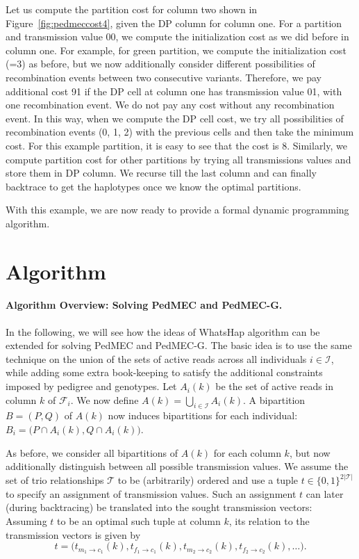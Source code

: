 Let us compute the partition cost for column two shown in Figure~\ref{fig:pedmeccost4}, given the DP column for column one.
For a partition and transmission value 00, we compute the initialization cost as we did before in column one. 
For example, for green partition, we compute the initialization cost (=3) as before, but we now additionally consider different possibilities of recombination events between two consecutive variants.
Therefore, we pay additional cost 91 if the DP cell at column one has transmission value 01, with one recombination event. We do not pay any cost without any recombination event.
In this way, when we compute the DP cell cost, we try all possibilities of recombination events (0, 1, 2) with the previous cells and then take the minimum cost. For this example partition, it is easy to see that the cost is 8.
Similarly, we compute partition cost for other partitions by trying all transmissions values and store them in DP column.
We recurse till the last column and can finally backtrace to get the haplotypes once we know the optimal partitions.

With this example, we are now ready to provide a formal dynamic programming algorithm.

\section{Algorithm}\label{sec:algorithm}
\paragraph{Algorithm Overview: Solving PedMEC and PedMEC-G.}
In the following, we will see how the ideas of WhatsHap algorithm can be extended for solving PedMEC and PedMEC-G.
The basic idea is to use the same technique on the union of the sets of active reads across all individuals $i\in\mathcal{I}$, while adding some extra book-keeping to satisfy the additional constraints imposed by pedigree and genotypes.
Let $A_i(k)$ be the set of active reads in column $k$ of $\mathcal{F}_i$.
We now define $A(k)=\bigcup_{i\in\mathcal{I}}A_i(k)$.
A bipartition $B=(P,Q)$ of $A(k)$ now induces bipartitions for each individual: $B_i=\big(P\cap A_i(k), Q\cap A_i(k)\big)$.

As before, we consider all bipartitions of $A(k)$ for each column $k$, but now additionally distinguish between all possible transmission values.
We assume the set of trio relationships $\mathcal{T}$ to be (arbitrarily) ordered and use a tuple $t\in\{0,1\}^{2|\mathcal{T}|}$ to specify an assignment of transmission values.
Such an assignment $t$ can later (during backtracing) be translated into the sought transmission vectors:
Assuming $t$ to be an optimal such tuple at column $k$, its relation to the transmission vectors is given by
\[t=\big(t_{m_1\to c_1}(k),t_{f_1\to c_1}(k),t_{m_2\to c_2}(k),t_{f_2\to c_2}(k),\ldots\big).\]


